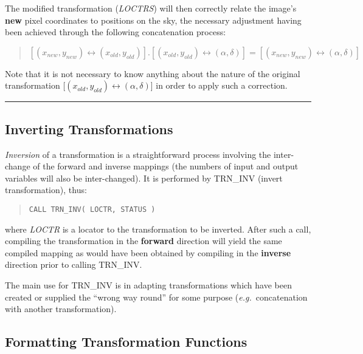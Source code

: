 \documentclass[twoside,11pt]{article}
\newcommand{\xlabel}[1]{}
\newcommand{\name}[1]{\mbox{\small{#1}}}
\newcommand{\fortvar}[1]{\mbox{\emph{#1}}}
\newcommand{\exampledone}[0]{\begin{center} \rule{6em}{0.2mm} \end{center}}
\begin{document}
The modified transformation (\fortvar{LOCTRS}\/) will then correctly relate
the image's \textbf{new} pixel coordinates to positions on the sky, the
necessary adjustment having been achieved through the following
concatenation process: 

\begin{quote}
\begin{center}
$[(x_{new},y_{new}) \leftrightarrow (x_{old},y_{old})].[(x_{old},y_{old}) 
\leftrightarrow (\alpha,\delta)] = [(x_{new},y_{new}) \leftrightarrow 
(\alpha,\delta)]$
\end{center}
\end{quote}

Note that it is not necessary to know anything about the nature of the
original transformation \mbox{[$(x_{old},y_{old}) \leftrightarrow 
(\alpha,\delta)$]} in order to apply such a correction.  
\exampledone


\subsection{\xlabel{inverting_transformations}Inverting Transformations}

\label{section:additional:inverting}

\emph{Inversion} of a transformation is a straightforward process involving
the inter-change of the forward and inverse mappings (the numbers of input
and output variables will also be inter-changed).
It is performed by \name{TRN\_INV} (invert transformation), thus:

\begin{quote}
\begin{verbatim}
CALL TRN_INV( LOCTR, STATUS )
\end{verbatim}
\end{quote}

where \fortvar{LOCTR} is a locator to the transformation to be inverted.
After such a call, compiling the transformation in the \textbf{forward}
direction will yield the same compiled mapping as would have been obtained
by compiling in the \textbf{ inverse} direction prior to calling
\name{TRN\_INV}. 

The main use for \name{TRN\_INV} is in adapting transformations which have
been created or supplied the ``wrong way round'' for some purpose 
(\emph{e.g.}\ concatenation with another transformation). 


\subsection{\xlabel{formatting_transformation_functions}Formatting Transformation Functions}
\end{document}
